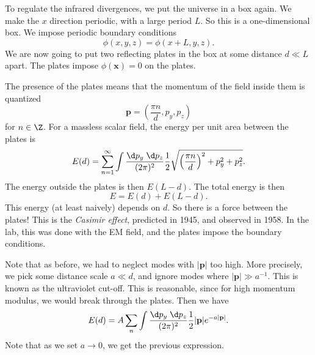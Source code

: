 \documentclass[a4paper]{article}
\begin{document}
To regulate the infrared divergences, we put the universe in a box again. We make the $x$ direction periodic, with a large period $L$. So this is a one-dimensional box. We impose periodic boundary conditions
\[
  \phi(x, y, z) = \phi(x + L, y, z).
\]
We are now going to put two reflecting plates in the box at some distance $d \ll L$ apart. The plates impose $\phi(\mathbf{x}) = 0$ on the plates.
\begin{center}
\end{center}
The presence of the plates means that the momentum of the field inside them is quantized
\[
  \mathbf{p} = \left(\frac{\pi n}{d}, p_y, p_z\right)
\]
for $n \in \Z$. For a massless scalar field, the energy per unit area between the plates is
\[
  E(d) = \sum_{n = 1}^\infty \int \frac{\d p_y\;\d p_z}{(2\pi)^2} \frac{1}{2} \sqrt{\left(\frac{\pi n}{d}\right)^2 + p_y^2 +p_z^2}.
\]
The energy outside the plates is then $E(L - d)$. The total energy is then
\[
  E = E(d) + E(L - d).
\]
This energy (at least naively) depends on $d$. So there is a force between the plates! This is the \emph{Casimir effect}, predicted in 1945, and observed in 1958. In the lab, this was done with the EM field, and the plates impose the boundary conditions.

Note that as before, we had to neglect modes with $|\mathbf{p}|$ too high. More precisely, we pick some distance scale $a \ll d$, and ignore modes where $|\mathbf{p}| \gg a^{-1}$. This is known as the ultraviolet cut-off. This is reasonable, since for high momentum modulus, we would break through the plates. Then we have
\[
  E(d) = A \sum_n \int \frac{\d p_y \;\d p_z}{(2\pi)^2} \frac{1}{2}|\mathbf{p}| e^{-a|\mathbf{p}|}.
\]
Note that as we set $a \to 0$, we get the previous expression.
\end{document}
